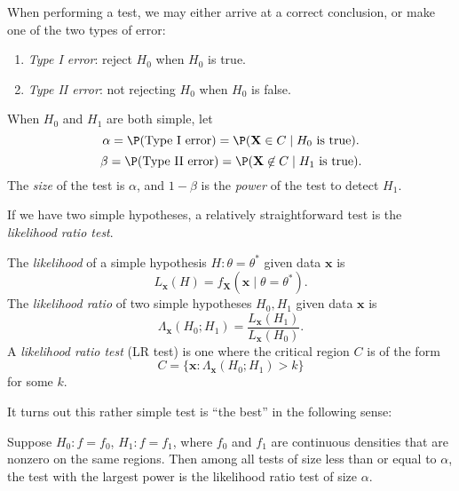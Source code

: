 \documentclass[a4paper]{article}
\begin{document}
When performing a test, we may either arrive at a correct conclusion, or make one of the two types of error:
\begin{defi}\leavevmode
  \begin{enumerate}
    \item \emph{Type I error}: reject $H_0$ when $H_0$ is true.
    \item \emph{Type II error}: not rejecting $H_0$ when $H_0$ is false.
  \end{enumerate}
\end{defi}

\begin{defi}
When $H_0$ and $H_1$ are both simple, let
\[
  \alpha = \P(\text{Type I error}) = \P(\mathbf{X}\in C\mid H_0\text{ is true}).
\]
\[
  \beta = \P(\text{Type II error}) = \P(\mathbf{X}\not\in C\mid H_1\text{ is true}).
\]
The \emph{size} of the test is $\alpha$, and $1 - \beta$ is the \emph{power} of the test to detect $H_1$.
\end{defi}

If we have two simple hypotheses, a relatively straightforward test is the \emph{likelihood ratio test}.
\begin{defi}[Likelihood]
  The \emph{likelihood} of a simple hypothesis $H: \theta = \theta^*$ given data $\mathbf{x}$ is
  \[
    L_\mathbf{x}(H) = f_\mathbf{X}(\mathbf{x}\mid \theta = \theta^*).
  \]
  The \emph{likelihood ratio} of two simple hypotheses $H_0, H_1$ given data $\mathbf{x}$ is
  \[
    \Lambda_\mathbf{x}(H_0; H_1) = \frac{L_\mathbf{x}(H_1)}{L_\mathbf{x}(H_0)}.
  \]
  A \emph{likelihood ratio test} (LR test) is one where the critical region $C$ is of the form
  \[
    C = \{\mathbf{x}: \Lambda_\mathbf{x} (H_0; H_1) > k\}
  \]
  for some $k$.
\end{defi}

It turns out this rather simple test is ``the best'' in the following sense:
\begin{lemma}
  Suppose $H_0: f = f_0$, $H_1: f = f_1$, where $f_0$ and $f_1$ are continuous densities that are nonzero on the same regions. Then among all tests of size less than or equal to $\alpha$, the test with the largest power is the likelihood ratio test of size $\alpha$.
\end{lemma}
\end{document}

